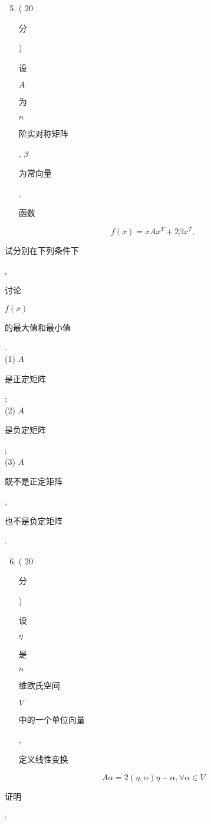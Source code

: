\documentclass[10pt]{article}
\begin{document}
\begin{enumerate}
  \setcounter{enumi}{4}
  \item ( 20 \begin{CJK}{UTF8}{mj}分\end{CJK}) \begin{CJK}{UTF8}{mj}设\end{CJK} $A$ \begin{CJK}{UTF8}{mj}为\end{CJK} $n$ \begin{CJK}{UTF8}{mj}阶实对称矩阵\end{CJK}, $\beta$ \begin{CJK}{UTF8}{mj}为常向量\end{CJK}, \begin{CJK}{UTF8}{mj}函数\end{CJK}
\end{enumerate}
$$
f(x)=x A x^{T}+2 \beta x^{T},
$$
\begin{CJK}{UTF8}{mj}试分别在下列条件下\end{CJK}, \begin{CJK}{UTF8}{mj}讨论\end{CJK} $f(x)$ \begin{CJK}{UTF8}{mj}的最大值和最小值\end{CJK}.\\
(1) $A$ \begin{CJK}{UTF8}{mj}是正定矩阵\end{CJK};\\
(2) $A$ \begin{CJK}{UTF8}{mj}是负定矩阵\end{CJK};\\
(3) $A$ \begin{CJK}{UTF8}{mj}既不是正定矩阵\end{CJK}, \begin{CJK}{UTF8}{mj}也不是负定矩阵\end{CJK}.

\begin{enumerate}
  \setcounter{enumi}{5}
  \item ( 20 \begin{CJK}{UTF8}{mj}分\end{CJK}) \begin{CJK}{UTF8}{mj}设\end{CJK} $\eta$ \begin{CJK}{UTF8}{mj}是\end{CJK} $n$ \begin{CJK}{UTF8}{mj}维欧氏空间\end{CJK} $V$ \begin{CJK}{UTF8}{mj}中的一个单位向量\end{CJK}, \begin{CJK}{UTF8}{mj}定义线性变换\end{CJK}
\end{enumerate}
$$
A \alpha=2(\eta, \alpha) \eta-\alpha, \forall \alpha \in V
$$
\begin{CJK}{UTF8}{mj}证明\end{CJK}:
\end{document}
